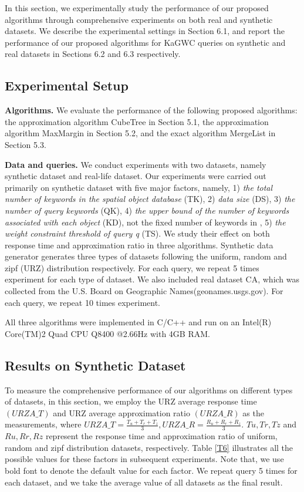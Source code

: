 In this section, we experimentally study the performance of our proposed algorithms through comprehensive experiments on both real and synthetic datasets. We describe the experimental settings in Section 6.1, and report the performance of our proposed algorithms for KaGWC queries on synthetic and real datasets in Sections 6.2 and 6.3 respectively.

\subsection{Experimental Setup}
\textbf{Algorithms.} We evaluate the performance of the following proposed algorithms: the approximation algorithm CubeTree in Section 5.1, the approximation algorithm MaxMargin in Section 5.2, and the exact algorithm MergeList in Section 5.3.

\textbf{Data and queries.} We conduct experiments with two datasets, namely synthetic dataset and real-life dataset. Our experiments were carried out primarily on synthetic dataset with five major factors, namely, 1) \textit{the total number of keywords in the spatial object database} (TK), 2) \textit{data size} (DS), 3) \textit{the number of query keywords} (QK), 4) \textit{the upper bound of the number of keywords associated with each object} (KD), not the fixed number of keywords in \cite{zhang2009keyword}, 5) \textit{the weight constraint threshold of query q} (TS). We study their effect on both response time and approximation ratio in three algorithms. Synthetic data generator generates three types of datasets following the uniform, random and zipf (URZ) distribution respectively. For each query, we repeat 5 times experiment for each type of dataset. We also included real dataset CA, which was collected from the U.S. Board on Geographic Names(geonames.usgs.gov). For each query, we repeat 10 times experiment.

All three algorithms were implemented in C/C++ and run on an Intel(R) Core(TM)2 Quad CPU Q8400 @2.66Hz with 4GB RAM.

\subsection{Results on Synthetic Dataset}
To measure the comprehensive performance of our algorithms on different types of datasets, in this section, we employ the URZ average response time $(URZA\_T)$ and URZ average approximation ratio $(URZA\_R)$ as the measurements, where $URZA\_T=\frac{T_u+T_r+T_z}{3}, URZA\_R=\frac{R_u+R_r+R_z}{3}$. $Tu, Tr, Tz$ and $Ru, Rr, Rz$ represent the response time and approximation ratio of uniform, random and zipf distribution datasets, respectively. Table \ref{T6} illustrates all the possible values for these factors in subsequent experiments. Note that, we use bold font to denote the default value for each factor. We repeat query 5 times for each dataset, and we take the average value of all datasets as the final result.

